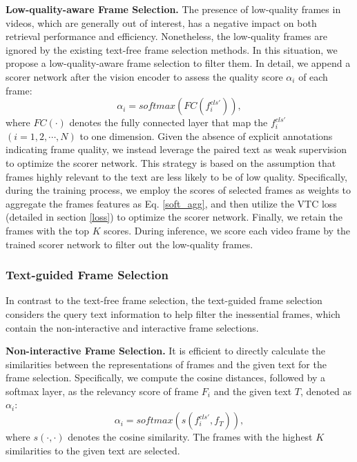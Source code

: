 \documentclass[11pt]{article}
\begin{document}
\textbf{Low-quality-aware Frame Selection.}
The presence of low-quality frames in videos, which are generally out of interest, has a negative impact on both retrieval performance and efficiency.
Nonetheless, the low-quality frames are ignored by the existing text-free frame selection methods.
In this situation, we propose a low-quality-aware frame selection to filter them.
In detail, we append a scorer network after the vision encoder to assess the quality score $\alpha_i$ of each frame:
\begin{equation}
    \alpha_i = softmax(FC(f_i^{cls\prime})),
\end{equation}
where $FC(\cdot)$ denotes the fully connected layer that map the $f_i^{cls\prime}$ $(i=1, 2, \cdots, N)$ to one dimension.
Given the absence of explicit annotations indicating frame quality, we instead leverage the paired text as weak supervision to optimize the scorer network.
This strategy is based on the assumption that frames highly relevant to the text are less likely to be of low quality.
Specifically, during the training process, we employ the scores of selected frames as weights to aggregate the frames features as Eq. \ref{soft_agg}, and then utilize the VTC loss (detailed in section \ref{loss}) to optimize the scorer network. 
Finally, we retain the frames with the top $K$ scores.
During inference, we score each video frame by the trained scorer network to filter out the low-quality frames.

\subsubsection{Text-guided Frame Selection}

In contrast to the text-free frame selection, the text-guided frame selection considers the query text information to help filter the inessential frames, which contain the non-interactive and interactive frame selections.

\textbf{Non-interactive Frame Selection.}
It is efficient to directly calculate the similarities between the representations of frames and the given text for the frame selection.
Specifically, we compute the cosine distances, followed by a softmax layer, as the relevancy score of frame $F_i$ and the given text $T$, denoted as $\alpha_i$:
\begin{equation}
    \alpha_i = softmax(s(f_i^{cls\prime}, f_T)),
\end{equation}
where $s(\cdot, \cdot)$ denotes the cosine similarity. 
The frames with the highest $K$ similarities to the given text are selected.
\end{document}
